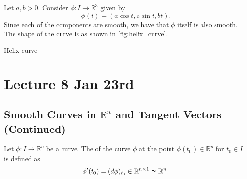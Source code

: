 \documentclass[notoc,notitlepage]{tufte-book}
\begin{document}
\begin{eg}
  Let $a, b > 0$. Consider $\phi : I \to \mathbb{R}^3$ given by
  \begin{equation*}
    \phi(t) = (a \cos t, a \sin t, bt).
  \end{equation*}
  Since each of the components are smooth, we have that $\phi$
  itself is also smooth. The shape of the curve is as shown in \cref{fig:helix_curve}.
  \begin{marginfigure}
    \centering
    \caption{Helix curve}\label{fig:helix_curve}
  \end{marginfigure}
\end{eg}



\chapter{Lecture 8 Jan 23rd}%
\label{chp:lecture_8_jan_23rd}

\section{Smooth Curves in \texorpdfstring{$\mathbb{R}^n$}{Rn} and Tangent Vectors (Continued)}%
\label{sec:smooth_curves_in_r_n_and_tangent_vectors_continued}

\begin{defn}[Velocity]\label{defn:velocity}
  Let $\phi : I \to \mathbb{R}^n$ be a curve. The  of the curve
  $\phi$ at the point $\phi(t_0) \in \mathbb{R}^n$ for $t_0 \in I$ is defined as
  \begin{equation*}
    \phi'(t_0) = (\mathop{}\!d{\phi})_{t_0} \in \mathbb{R}^{n \times 1} \simeq \mathbb{R}^n.
  \end{equation*}
\end{defn}
\end{document}
